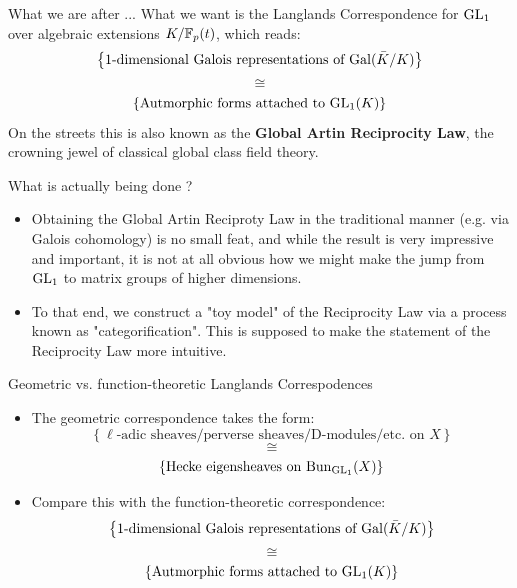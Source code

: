\documentclass[professionalfonts]{beamer}
\begin{document}
    \begin{frame}{What we are after ...}
        What we want is the Langlands Correspondence for $\operatorname{GL}_1$ over algebraic extensions $K/\mathbb{F}_p(t)$, which reads:
            $$\left\{\text{$1$-dimensional Galois representations of $\mathrm{Gal}(\bar{K}/K)$}\right\}$$
            $$\cong$$
            $$\left\{\text{Autmorphic forms attached to $\operatorname{GL}_1(K)$}\right\}$$
        On the streets this is also known as the \textbf{Global Artin Reciprocity Law}, the crowning jewel of classical global class field theory.
    \end{frame}
    
    \begin{frame}{What is actually being done ?}
        \begin{itemize}
            \item Obtaining the Global Artin Reciproty Law in the traditional manner (e.g. via Galois cohomology) is no small feat, and while the result is very impressive and important, it is not at all obvious how we might make the jump from $\operatorname{GL}_1$ to matrix groups of higher dimensions.
            \item To that end, we construct a "toy model" of the Reciprocity Law via a process known as "categorification". This is supposed to make the statement of the Reciprocity Law more intuitive.
        \end{itemize}
    \end{frame}
    
    \begin{frame}{Geometric vs. function-theoretic Langlands Correspodences}
        \begin{itemize}
            \item The geometric correspondence takes the form:
                $$\left\{\text{$\ell$-adic sheaves/perverse sheaves/D-modules/etc. on $X$}\right\}$$
                $$\cong$$
                $$\left\{\text{Hecke eigensheaves on $\mathrm{Bun}_{\operatorname{GL}_1}(X)$}\right\}$$
            \item Compare this with the function-theoretic correspondence:
                $$\left\{\text{$1$-dimensional Galois representations of $\mathrm{Gal}(\bar{K}/K)$}\right\}$$
                $$\cong$$
                $$\left\{\text{Autmorphic forms attached to $\operatorname{GL}_1(K)$}\right\}$$
        \end{itemize}
    \end{frame}
    
\end{document}
